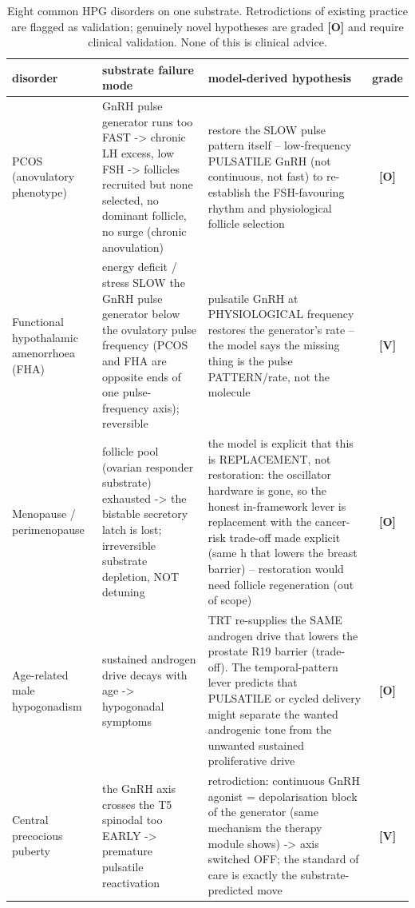 \documentclass[11pt]{article}
\newcommand{\gradeV}{\textcolor{verified}{\textbf{[V]}}}
\newcommand{\gradeO}{\textcolor{open}{\textbf{[O]}}}
\begin{document}
\begin{table}[H]
\centering
\small
\caption{Eight common HPG disorders on one substrate. Retrodictions of existing practice are flagged as validation; genuinely novel hypotheses are graded \gradeO{} and require clinical validation. None of this is clinical advice.}
\label{tab:disorders}
\begin{tabular}{p{2.6cm}p{4.2cm}p{4.6cm}c}
\toprule
disorder & substrate failure mode & model-derived hypothesis & grade \\
\midrule
PCOS (anovulatory phenotype) & GnRH pulse generator runs too FAST -> chronic LH excess, low FSH -> follicles recruited but none selected, no dominant follicle, no surge (chronic anovulation) & restore the SLOW pulse pattern itself -- low-frequency PULSATILE GnRH (not continuous, not fast) to re-establish the FSH-favouring rhythm and physiological follicle selection & \gradeO \\
Functional hypothalamic amenorrhoea (FHA) & energy deficit / stress SLOW the GnRH pulse generator below the ovulatory pulse frequency (PCOS and FHA are opposite ends of one pulse-frequency axis); reversible & pulsatile GnRH at PHYSIOLOGICAL frequency restores the generator's rate -- the model says the missing thing is the pulse PATTERN/rate, not the molecule & \gradeV \\
Menopause / perimenopause & follicle pool (ovarian responder substrate) exhausted -> the bistable secretory latch is lost; irreversible substrate depletion, NOT detuning & the model is explicit that this is REPLACEMENT, not restoration: the oscillator hardware is gone, so the honest in-framework lever is replacement with the cancer-risk trade-off made explicit (same h that lowers the breast barrier) -- restoration would need follicle regeneration (out of scope) & \gradeO \\
Age-related male hypogonadism & sustained androgen drive decays with age -> hypogonadal symptoms & TRT re-supplies the SAME androgen drive that lowers the prostate R19 barrier (trade-off). The temporal-pattern lever predicts that PULSATILE or cycled delivery might separate the wanted androgenic tone from the unwanted sustained proliferative drive & \gradeO \\
Central precocious puberty & the GnRH axis crosses the T5 spinodal too EARLY -> premature pulsatile reactivation & retrodiction: continuous GnRH agonist = depolarisation block of the generator (same mechanism the therapy module shows) -> axis switched OFF; the standard of care is exactly the substrate-predicted move & \gradeV \\

\end{tabular}
\end{table}
\end{document}
